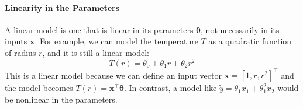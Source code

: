 \paragraph*{Linearity in the Parameters}
A linear model is one that is linear in its parameters $\boldsymbol{\theta}$, not necessarily in its inputs $\mathbf{x}$. For example, we can model the temperature $T$ as a quadratic function of radius $r$, and it is still a linear model:
\begin{equation}
    T(r) = \theta_0 + \theta_1 r + \theta_2 r^2
\end{equation}
This is a linear model because we can define an input vector $\mathbf{x} = [1, r, r^2]^\top$ and the model becomes $T(r) = \mathbf{x}^\top \boldsymbol{\theta}$. In contrast, a model like $\tilde{y} = \theta_1 x_1 + \theta_1^2 x_2$ would be nonlinear in the parameters.

